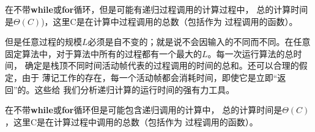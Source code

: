 \begin{lemma}\label{Lemma:3_1}
在不带\textbf{while}或\textbf{for}循环，但是可能有递归过程调用的计算过程中，
总的计算时间是$\Theta(C)$)，这里C是在计算中过程调用的总数（包括作为
过程调用的函数）。
\end{lemma}

但是任意过程的规模$L$必须是自不变的；就是说不会因输入的不同而不同。在任意
固定算法中，对于算法中所有的过程都有一个最大的$L$。每一次运行算法的总时间，
确定是栈顶不同时间活动帧代表的过程调用的时间的总和。还可以合理的假定，由于
薄记工作的存在，每一个活动帧都会消耗时间，即使它是立即“返回”的。这些给
我们分析递归计算的运行时间的强有力工具。

\begin{theorem}
在不带\textbf{while}或\textbf{for}循环但是可能包含递归调用的计算中，
总的计算时间是$\Theta(C)$，这里C是在计算过程中调用的总数（包括作为
过程调用的函数）。
\end{theorem}

